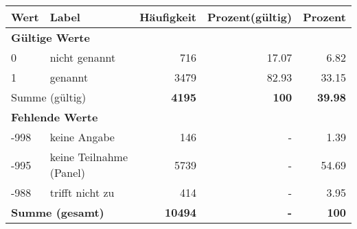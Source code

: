      \begin{longtable}{lXrrr}
     \toprule
     \textbf{Wert} & \textbf{Label} & \textbf{Häufigkeit} & \textbf{Prozent(gültig)} & \textbf{Prozent} \\
     \endhead
     \midrule
     \multicolumn{5}{l}{\textbf{Gültige Werte}}\\

     0 &
     \multicolumn{1}{X}{ nicht genannt   } &


       \num{716} &
       \num[round-mode=places,round-precision=2]{17,07} &
         \num[round-mode=places,round-precision=2]{6,82} \\

     1 &
     \multicolumn{1}{X}{ genannt   } &


       \num{3479} &
       \num[round-mode=places,round-precision=2]{82,93} &
         \num[round-mode=places,round-precision=2]{33,15} \\
     \midrule
     \multicolumn{2}{l}{Summe (gültig)} &
       \textbf{\num{4195}} &
     \textbf{100} &
       \textbf{\num[round-mode=places,round-precision=2]{39,98}} \\
     \multicolumn{5}{l}{\textbf{Fehlende Werte}}\\
       -998 &
       keine Angabe &
         \num{146} &
        - &
         \num[round-mode=places,round-precision=2]{1,39} \\
       -995 &
       keine Teilnahme (Panel) &
         \num{5739} &
        - &
         \num[round-mode=places,round-precision=2]{54,69} \\
       -988 &
       trifft nicht zu &
         \num{414} &
        - &
         \num[round-mode=places,round-precision=2]{3,95} \\
     \midrule
     \multicolumn{2}{l}{\textbf{Summe (gesamt)}} &
          \textbf{\num{10494}} &
        \textbf{-} &
        \textbf{100} \\
     \bottomrule
     \end{longtable}
     
